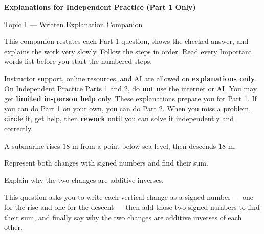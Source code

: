 
\begin{center}
  {\LARGE\bfseries Explanations for Independent Practice (Part 1 Only)}\par
  \medskip
  {\large Topic 1 --- Written Explanation Companion}
\end{center}
\medskip

\noindent This companion restates each Part 1 question, shows the checked
answer, and explains the work very slowly. Follow the steps in order. Read
every Important words list before you start the numbered steps.

\noindent Instructor support, online resources, and AI are allowed on
\textbf{explanations only}. On Independent Practice Parts 1 and 2, do
\textbf{not} use the internet or AI. You may get \textbf{limited in-person
help} only. These explanations prepare you for Part 1. If you can do Part 1 on
your own, you can do Part 2. When you miss a problem, \textbf{circle} it, get
help, then \textbf{rework} until you can solve it independently and correctly.



\noindent A submarine rises $18$ m from a point below sea level, then descends
$18$ m.

\par\noindent{}Represent both changes with signed numbers and find
their sum.
\par\noindent{}Explain why the two changes are additive inverses.


\noindent This question asks you to write each vertical change as a signed
number --- one for the rise and one for the descent --- then add those two
signed numbers to find their sum, and finally say why the two changes are
additive inverses of each other.

